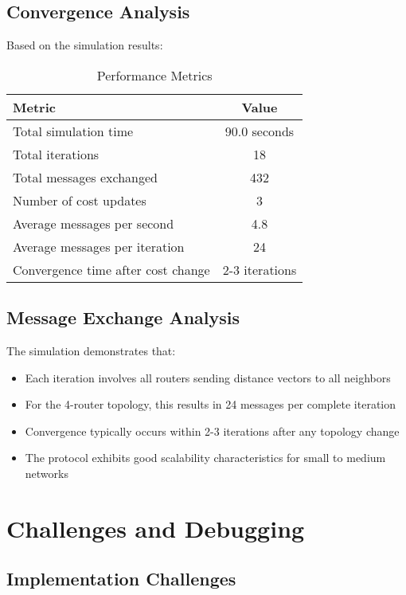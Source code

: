 \documentclass[12pt,a4paper]{article}
\begin{document}
\subsection{Convergence Analysis}

Based on the simulation results:

\begin{table}[H]
\centering
\caption{Performance Metrics}
\begin{tabular}{|l|c|}
\hline
\textbf{Metric} & \textbf{Value} \\
\hline
Total simulation time & 90.0 seconds \\
Total iterations & 18 \\
Total messages exchanged & 432 \\
Number of cost updates & 3 \\
Average messages per second & 4.8 \\
Average messages per iteration & 24 \\
Convergence time after cost change & 2-3 iterations \\
\hline
\end{tabular}
\end{table}

\subsection{Message Exchange Analysis}

The simulation demonstrates that:
\begin{itemize}
\item Each iteration involves all routers sending distance vectors to all neighbors
\item For the 4-router topology, this results in 24 messages per complete iteration
\item Convergence typically occurs within 2-3 iterations after any topology change
\item The protocol exhibits good scalability characteristics for small to medium networks
\end{itemize}

\section{Challenges and Debugging}

\subsection{Implementation Challenges}
\end{document}
